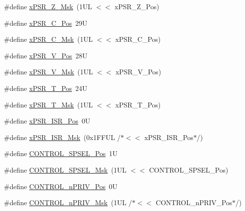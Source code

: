 \begin{DoxyCompactItemize}
\#define \mbox{\hyperlink{group___c_m_s_i_s___c_o_r_e_ga907599209fba99f579778e662021c4f2}{x\+P\+S\+R\+\_\+\+Z\+\_\+\+Msk}}~(1\+U\+L $<$$<$ x\+P\+S\+R\+\_\+\+Z\+\_\+\+Pos)
\item 
\#define \mbox{\hyperlink{group___c_m_s_i_s___c_o_r_e_ga14adb79b91f6634b351a1b57394e2db6}{x\+P\+S\+R\+\_\+\+C\+\_\+\+Pos}}~29U
\item 
\#define \mbox{\hyperlink{group___c_m_s_i_s___c_o_r_e_ga21e2497255d380f956ca0f48d11d0775}{x\+P\+S\+R\+\_\+\+C\+\_\+\+Msk}}~(1\+U\+L $<$$<$ x\+P\+S\+R\+\_\+\+C\+\_\+\+Pos)
\item 
\#define \mbox{\hyperlink{group___c_m_s_i_s___c_o_r_e_gae0cfbb394490db402623d97e6a979e00}{x\+P\+S\+R\+\_\+\+V\+\_\+\+Pos}}~28U
\item 
\#define \mbox{\hyperlink{group___c_m_s_i_s___c_o_r_e_gab07f94ed3b6ee695f5af719dc27995c2}{x\+P\+S\+R\+\_\+\+V\+\_\+\+Msk}}~(1\+U\+L $<$$<$ x\+P\+S\+R\+\_\+\+V\+\_\+\+Pos)
\item 
\#define \mbox{\hyperlink{group___c_m_s_i_s___c_o_r_e_ga98d801da9a49cda944f52aeae104dd38}{x\+P\+S\+R\+\_\+\+T\+\_\+\+Pos}}~24U
\item 
\#define \mbox{\hyperlink{group___c_m_s_i_s___c_o_r_e_ga30ae2111816e82d47636a8d4577eb6ee}{x\+P\+S\+R\+\_\+\+T\+\_\+\+Msk}}~(1\+U\+L $<$$<$ x\+P\+S\+R\+\_\+\+T\+\_\+\+Pos)
\item 
\#define \mbox{\hyperlink{group___c_m_s_i_s___c_o_r_e_ga21bff245fb1aef9683f693d9d7bb2233}{x\+P\+S\+R\+\_\+\+I\+S\+R\+\_\+\+Pos}}~0U
\item 
\#define \mbox{\hyperlink{group___c_m_s_i_s___c_o_r_e_gadf8eed87e0081dfe1ef1c78a0ea91afd}{x\+P\+S\+R\+\_\+\+I\+S\+R\+\_\+\+Msk}}~(0x1\+F\+F\+U\+L /$\ast$$<$$<$ x\+P\+S\+R\+\_\+\+I\+S\+R\+\_\+\+Pos$\ast$/)
\item 
\#define \mbox{\hyperlink{group___c_m_s_i_s___c_o_r_e_ga07eafc53e609895342c6a530e9d01310}{C\+O\+N\+T\+R\+O\+L\+\_\+\+S\+P\+S\+E\+L\+\_\+\+Pos}}~1U
\item 
\#define \mbox{\hyperlink{group___c_m_s_i_s___c_o_r_e_ga70b29840969b06909da21369b0b05b53}{C\+O\+N\+T\+R\+O\+L\+\_\+\+S\+P\+S\+E\+L\+\_\+\+Msk}}~(1\+U\+L $<$$<$ C\+O\+N\+T\+R\+O\+L\+\_\+\+S\+P\+S\+E\+L\+\_\+\+Pos)
\item 
\#define \mbox{\hyperlink{group___c_m_s_i_s___c_o_r_e_ga51b95bc03ec0d815b459bde0b14a5908}{C\+O\+N\+T\+R\+O\+L\+\_\+n\+P\+R\+I\+V\+\_\+\+Pos}}~0U
\item 
\#define \mbox{\hyperlink{group___c_m_s_i_s___c_o_r_e_gaef3b20d77acb213338f89ce5e7bc36b0}{C\+O\+N\+T\+R\+O\+L\+\_\+n\+P\+R\+I\+V\+\_\+\+Msk}}~(1\+U\+L /$\ast$$<$$<$ C\+O\+N\+T\+R\+O\+L\+\_\+n\+P\+R\+I\+V\+\_\+\+Pos$\ast$/)
$$
\end{DoxyCompactItemize}
